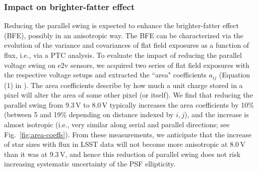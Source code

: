 \subsubsection{Impact on brighter-fatter effect}\label{impact-on-brighter-fatter-effect}

Reducing the parallel swing is expected to enhance the brighter-fatter
effect (BFE), possibly in an anisotropic way. The BFE can be
characterized via the evolution of the variance and covariances of
flat field exposures as a function of flux, i.e., via a PTC analysis. To evaluate the
impact of reducing the parallel voltage swing on e2v sensors, we
acquired two series of flat field exposures with the respective voltage
setups and extracted the ``area" coefficients $a_{ij}$
(Equation (1) in \citet{2023A&A...670A.118A}).
The area coefficients describe by how much a unit charge stored in
a pixel will alter the area of some other pixel (or itself). We find that
reducing the parallel swing from 9.3\,V to 8.0\,V typically increases the
area coefficients by 10\% (between 5 and 19\% depending on distance indexed by $i,j$),
and the increase is almost isotropic (i.e., very similar along serial and parallel
directions; see Fig.~\ref{fig:area-coeffs}). From these measurements, we anticipate that the increase of
star sizes with flux in LSST data will not become more anisotropic at 8.0\,V than it was at
9.3\,V, and hence this reduction of parallel swing does not 
risk increasing systematic uncertainty of the PSF ellipticity.

